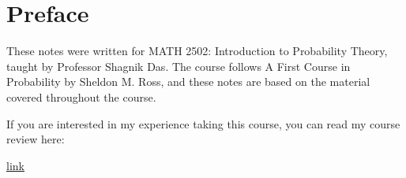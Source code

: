 \documentclass[a4paper,oneside]{scrbook}
\begin{document}
\begin{titlepage}
\end{titlepage}

\chapter*{Preface}

These notes were written for MATH 2502: Introduction to Probability Theory, taught by Professor Shagnik Das. The course follows A First Course in Probability by Sheldon M. Ross, and these notes are based on the material covered throughout the course.

If you are interested in my experience taking this course, you can read my course review here:

\href{https://konyi0613.github.io/posts/%E5%8F%B0%E5%A4%A7%E8%B3%87%E5%B7%A5%E5%A4%A7%E4%BA%8C%E4%B8%8B%E4%BF%AE%E8%AA%B2%E5%BF%83%E5%BE%97/}{link}

\newpage

\tableofcontents


\newpage
\appendix
\appendixpage{}



\newpage
\pagestyle{plain}
\printbibliography{}
\end{document}

